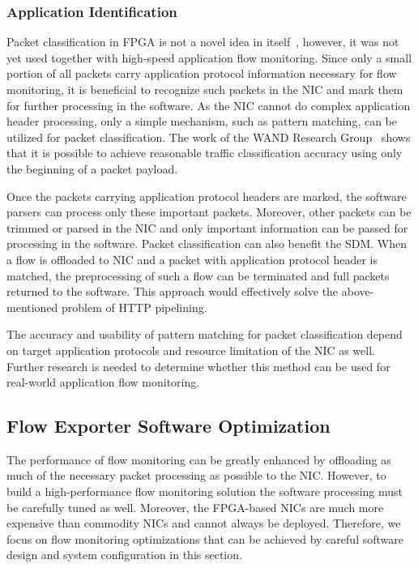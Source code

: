 \subsubsection{Application Identification}

Packet classification in FPGA is not a novel idea in itself~\cite{Song-2005-Efficient}, however, it was not yet used together with high-speed application flow monitoring. Since only a small portion of all packets carry application protocol information necessary for flow monitoring, it is beneficial to recognize such packets in the NIC and mark them for further processing in the software. As the NIC cannot do complex application header processing, only a simple mechanism, such as pattern matching, can be utilized for packet classification. The work of the WAND Research Group~\cite{Alcock-2012-libprotoident} shows that it is possible to achieve reasonable traffic classification accuracy using only the beginning of a packet payload. 

Once the packets carrying application protocol headers are marked, the software parsers can process only these important packets. Moreover, other packets can be trimmed or parsed in the NIC and only important information can be passed for processing in the software. Packet classification can also benefit the SDM. When a flow is offloaded to NIC and a packet with application protocol header is matched, the preprocessing of such a flow can be terminated and full packets returned to the software. This approach would effectively solve the above-mentioned problem of HTTP pipelining. 

The accuracy and usability of pattern matching for packet classification depend on target application protocols and resource limitation of the NIC as well. Further research is needed to determine whether this method can be used for real-world application flow monitoring.


\subsection{Flow Exporter Software Optimization}\label{sec:performance-sw-optimization}

The performance of flow monitoring can be greatly enhanced by offloading as much of the necessary packet processing as possible to the NIC. However, to build a high-performance flow monitoring solution the software processing must be carefully tuned as well. Moreover, the FPGA-based NICs are much more expensive than commodity NICs and cannot always be deployed. Therefore, we focus on flow monitoring optimizations that can be achieved by careful software design and system configuration in this section.

